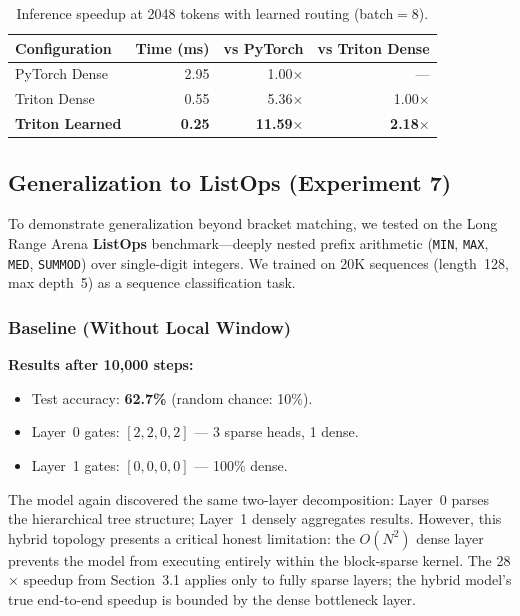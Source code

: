 \documentclass[11pt,a4paper]{article}
\begin{document}
\begin{table}[h]
\centering
\caption{Inference speedup at 2048 tokens with learned routing (batch$=8$).}
\label{tab:bridge2048}
\begin{tabular}{@{}lrrr@{}}
\toprule
Configuration & Time (ms) & vs PyTorch & vs Triton Dense \\
\midrule
PyTorch Dense           & 2.95 & 1.00$\times$  & --- \\
Triton Dense            & 0.55 & 5.36$\times$  & 1.00$\times$ \\
\textbf{Triton Learned} & \textbf{0.25} & \textbf{11.59$\times$} & \textbf{2.18$\times$} \\
\bottomrule
\end{tabular}
\end{table}

\subsection{Generalization to ListOps (Experiment 7)}

To demonstrate generalization beyond bracket matching, we tested on the Long Range Arena \textbf{ListOps} benchmark---deeply nested prefix arithmetic (\texttt{MIN}, \texttt{MAX}, \texttt{MED}, \texttt{SUMMOD}) over single-digit integers. We trained on 20K sequences (length~128, max depth~5) as a sequence classification task.

\subsubsection{Baseline (Without Local Window)}

\textbf{Results after 10,000 steps:}
\begin{itemize}
    \item Test accuracy: \textbf{62.7\%} (random chance: 10\%).
    \item Layer~0 gates: $[2, 2, 0, 2]$ --- 3 sparse heads, 1 dense.
    \item Layer~1 gates: $[0, 0, 0, 0]$ --- 100\% dense.
\end{itemize}

The model again discovered the same two-layer decomposition: Layer~0 parses the hierarchical tree structure; Layer~1 densely aggregates results. However, this hybrid topology presents a critical honest limitation: the $O(N^2)$ dense layer prevents the model from executing entirely within the block-sparse kernel. The 28$\times$ speedup from Section~3.1 applies only to fully sparse layers; the hybrid model's true end-to-end speedup is bounded by the dense bottleneck layer.
\end{document}
